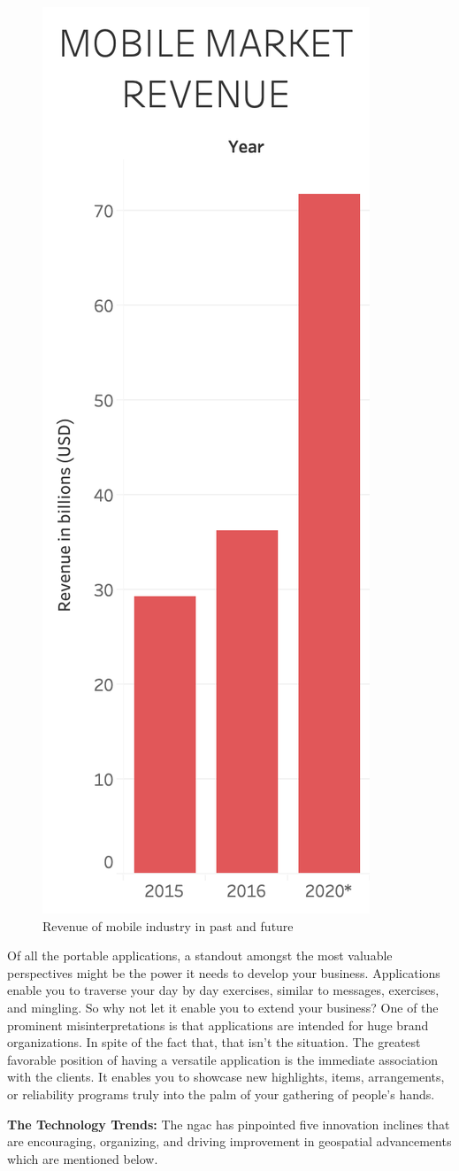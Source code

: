    \begin{figure}[H]
            \centering
            \includegraphics[width=0.25\linewidth]{figures/ch1/future_work_growth.png}
            \caption{\label{fig:future_work_distribution} Revenue of mobile industry in past and future \cite{eBiz_solutions}}
    \end{figure}

Of all the portable applications, a standout amongst the most valuable perspectives might be the power it needs to develop your business. Applications enable you to traverse your day by day exercises, similar to messages, exercises, and mingling. So why not let it enable you to extend your business? One of the prominent misinterpretations is that applications are intended for huge brand organizations. In spite of the fact that, that isn't the situation. The greatest favorable position of having a versatile application is the immediate association with the clients. It enables you to showcase new highlights, items, arrangements, or reliability programs truly into the palm of your gathering of people's hands.

\textbf{The Technology Trends:} The \gls{ngac} has pinpointed five innovation inclines that are encouraging, organizing, and driving improvement in geospatial advancements which are mentioned below. 

